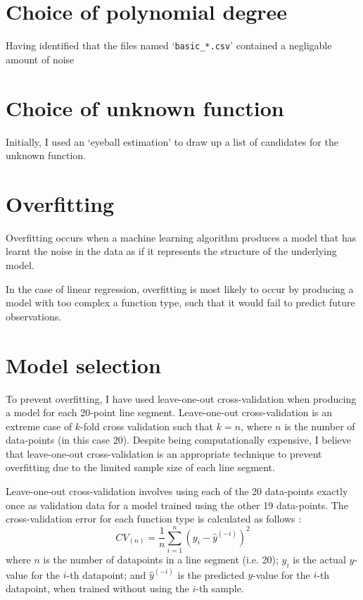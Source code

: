 \documentclass[onecolumn, 11pt, a4paper]{article}
\begin{document}
\section{Choice of polynomial degree}

Having identified that the files named `\texttt{basic\_*.csv}'
contained a negligable amount of noise


\section{Choice of unknown function}

Initially, I used an `eyeball estimation' to draw up a list
of candidates for the unknown function.

\section{Overfitting}

Overfitting occurs when a machine learning algorithm
produces a model that has learnt the noise in the data
as if it represents the structure of the underlying
model. \cite{MSMI}

In the case of linear regression, overfitting is most
likely to occur by producing a model with too complex a function
type, such that it would fail to predict future observations.

\section{Model selection}

To prevent overfitting, I have used leave-one-out
cross-validation when producing a model for each 20-point
line segment. Leave-one-out cross-validation is 
an extreme case of $k$-fold cross validation
such that $k = n$, where
$n$ is the number of data-points (in this case 20).
Despite being computationally expensive, I believe that
leave-one-out cross-validation is an appropriate technique
to prevent overfitting due to the limited sample size
of each line segment.

Leave-one-out cross-validation involves using each of
the 20 data-points exactly once as validation data for a model
trained using the other 19 data-points. 
The cross-validation error for each function type is calculated
as follows \cite{Stanford}:
\[
    CV_{(n)} = \frac{1}{n} \sum_{i = 1}^{n} (y_{i} - \hat{y}^{(-i)})^{2}
\]
where
$n$ is the number of datapoints in a line segment (i.e. 20);
$y_{i}$ is the actual $y$-value for the $i$-th datapoint;
and $\hat{y}^{(-i)}$ is the predicted $y$-value for the $i$-th
datapoint, when trained without using the $i$-th sample.
\end{document}
